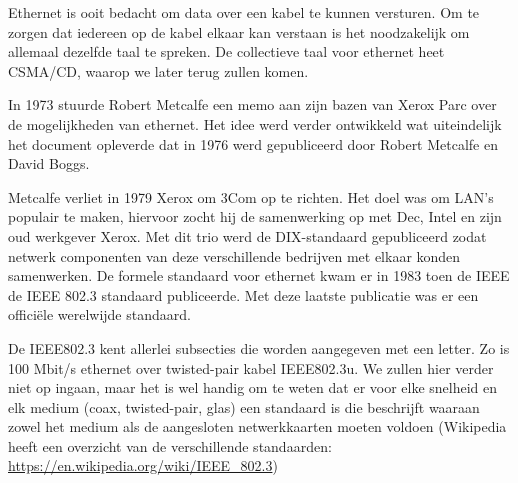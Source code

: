 Ethernet is ooit bedacht om data over een kabel te kunnen versturen. Om te zorgen dat iedereen op de kabel elkaar kan verstaan is het noodzakelijk om allemaal dezelfde taal te spreken. De collectieve taal voor ethernet heet CSMA/CD, waarop we later terug zullen komen.

In 1973 stuurde Robert Metcalfe een memo aan zijn bazen van Xerox Parc over de mogelijkheden van ethernet. Het idee werd verder ontwikkeld wat uiteindelijk het document  opleverde dat in 1976 werd gepubliceerd door Robert Metcalfe en David Boggs.

Metcalfe verliet in 1979 Xerox om 3Com op te richten. Het doel was om LAN's populair te maken, hiervoor zocht hij de samenwerking op met Dec, Intel en zijn oud werkgever Xerox. Met dit trio werd de DIX-standaard gepubliceerd zodat netwerk componenten van deze verschillende bedrijven met elkaar konden samenwerken. De formele standaard voor ethernet kwam er in 1983 toen de IEEE de IEEE 802.3 standaard publiceerde. Met deze laatste publicatie was er een offici\"ele werelwijde standaard.

De IEEE802.3 kent allerlei subsecties die worden aangegeven met een letter. Zo is 100 Mbit/s ethernet over twisted-pair kabel IEEE802.3u. We zullen hier verder niet op ingaan, maar het is wel handig om te weten dat er voor elke snelheid en elk medium (coax, twisted-pair, glas) een standaard is die beschrijft waaraan zowel het medium als de aangesloten netwerkkaarten moeten voldoen (Wikipedia heeft een overzicht van de verschillende standaarden: \url{https://en.wikipedia.org/wiki/IEEE_802.3})
